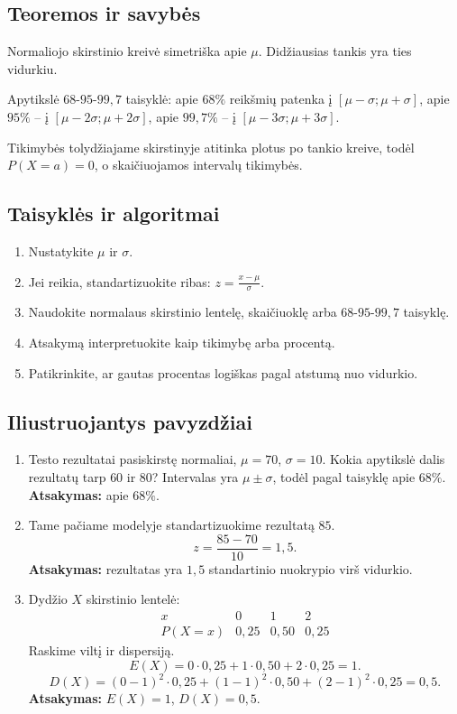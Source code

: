 \subsection{Teoremos ir savybės}
\begin{savybe}
Normaliojo skirstinio kreivė simetriška apie \(\mu\). Didžiausias tankis yra ties vidurkiu.
\end{savybe}
\begin{savybe}
Apytikslė \(68\)-\(95\)-\(99{,}7\) taisyklė:
apie \(68\%\) reikšmių patenka į \([\mu-\sigma;\mu+\sigma]\), apie \(95\%\) -- į \([\mu-2\sigma;\mu+2\sigma]\), apie \(99{,}7\%\) -- į \([\mu-3\sigma;\mu+3\sigma]\).
\end{savybe}
\begin{savybe}
Tikimybės tolydžiajame skirstinyje atitinka plotus po tankio kreive, todėl \(P(X=a)=0\), o skaičiuojamos intervalų tikimybės.
\end{savybe}

\subsection{Taisyklės ir algoritmai}
\begin{enumerate}[label=\arabic*.]
\item Nustatykite \(\mu\) ir \(\sigma\).
\item Jei reikia, standartizuokite ribas: \(z=\frac{x-\mu}{\sigma}\).
\item Naudokite normalaus skirstinio lentelę, skaičiuoklę arba \(68\)-\(95\)-\(99{,}7\) taisyklę.
\item Atsakymą interpretuokite kaip tikimybę arba procentą.
\item Patikrinkite, ar gautas procentas logiškas pagal atstumą nuo vidurkio.
\end{enumerate}

\subsection{Iliustruojantys pavyzdžiai}
\begin{enumerate}[label=\arabic*.]
\item Testo rezultatai pasiskirstę normaliai, \(\mu=70\), \(\sigma=10\). Kokia apytikslė dalis rezultatų tarp \(60\) ir \(80\)?
Intervalas yra \(\mu\pm\sigma\), todėl pagal taisyklę apie \(68\%\).
\textbf{Atsakymas:} apie \(68\%\).

\item Tame pačiame modelyje standartizuokime rezultatą \(85\).
\[
z=\frac{85-70}{10}=1{,}5.
\]
\textbf{Atsakymas:} rezultatas yra \(1{,}5\) standartinio nuokrypio virš vidurkio.

\item Dydžio \(X\) skirstinio lentelė:
\[
\begin{array}{c|ccc}
x&0&1&2\\ \hline
P(X=x)&0{,}25&0{,}50&0{,}25
\end{array}
\]
Raskime viltį ir dispersiją.
\[
E(X)=0\cdot0{,}25+1\cdot0{,}50+2\cdot0{,}25=1.
\]
\[
D(X)=(0-1)^2\cdot0{,}25+(1-1)^2\cdot0{,}50+(2-1)^2\cdot0{,}25=0{,}5.
\]
\textbf{Atsakymas:} \(E(X)=1\), \(D(X)=0{,}5\).
\end{enumerate}

